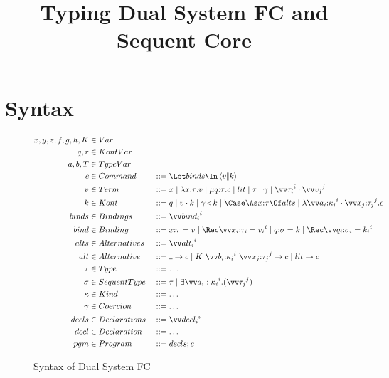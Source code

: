 \documentclass{article}
\begin{document}
\title{Typing Dual System FC and Sequent Core}

\maketitle

\section{Syntax}
\label{sec:syntax}

\begin{figure}[h]
\centering
\begin{gather*}
\begin{aligned}
  x, y, z, f, g, h, K &\in Var
  \\
  q, r &\in KontVar
  \\
  a, b, T &\in TypeVar
  \\
  \com &\in Command
  &
  &::= \mcut{\tm}{\ko}{\binds}
  \\
  \tm &\in Term
  &
  &::= x
  \Alt \fn{\ann x \ty} \tm
  \Alt \compute{\ann q \ty} \com
  \Alt \lit
  \Alt \ty
  \Alt \cn
  \Alt \packs{\vect[i]{\ty_i}}{\vect[j]{\tm_j}}
  \\
  \ko &\in Kont
  &
  &::= q
  \Alt \app{\tm}{\ko}
  \Alt \koerce{\cn}{\ko}
  \Alt \caseas{\ann x \ty}{\alts}
  \Alt \fnk{\packs{\vect[i]{\ann{a_i}{\ki_i}}}{\vect[j]{\ann{x_j}{\ty_j}}}}{\com}
  \\
  \binds &\in Bindings
  &
  &::= \vect[i]{\abind_i}
  \\
  \abind &\in Binding
  &
  &::= \bind{\ann x \ty}{\tm}
  \Alt \Rec \vect[i]{\bind{\ann{x_i}{\ty_i}}{\tm_i}}
  \Alt \bind{\ann q \sty}{\ko}
  \Alt \Rec \vect[i]{\bind{\ann{q_i}{\sty_i}}{\ko_i}}
  \\
  \alts &\in Alternatives
  &
  &::= \vect[i]{\analt_i}
  \\
  \analt &\in Alternative
  &
  &::= \alt{\blank}{\com}
  \Alt \alt{K ~ \vect[i]{\ann{b_i}{\ki_i}} ~ \vect[j]{\ann{x_j}{\ty_j}}}{\com}
  \Alt \alt{\lit}{\com}
  \\
  \ty &\in Type
  &
  &::= \dots
  \\
  \sty &\in SequentType
  &
  &::= \ty
  \Alt \stackty{\vect[i]{a_i:\ki_i}}{\vect[j]{\ty_j}}
  \\
  \ki &\in Kind
  &
  &::= \dots
  \\
  \cn &\in Coercion
  &
  &::= \dots
  \\
  \decls &\in Declarations
  &
  &::= \vect[i]{\decl_i}
  \\
  \decl &\in Declaration
  &
  &::= \dots
  \\
  \pgm &\in Program
  &
  &::= \decls; \com
\end{aligned}
\end{gather*}
\caption{Syntax of Dual System FC}
\label{fig:dual-fc-syntax}
\end{figure}
\end{document}
